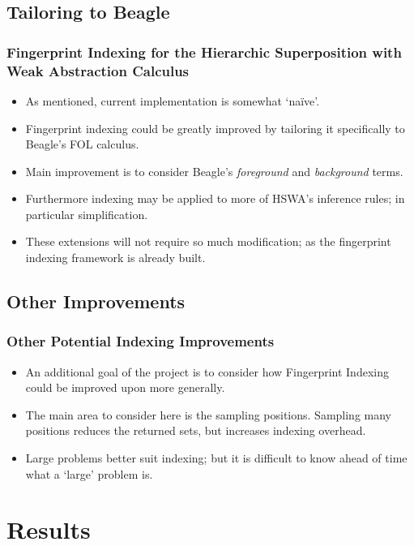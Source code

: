 \documentclass[10pt]{beamer}
\begin{document}
\begin{NoHyper}
\subsection{Tailoring to Beagle}
\begin{frame}
  \frametitle{Fingerprint Indexing for the Hierarchic Superposition with Weak Abstraction Calculus}
  \begin{itemize}
  \item<1-> As mentioned, current implementation is somewhat `na\"{i}ve'.
  \item<2-> Fingerprint indexing could be greatly improved by tailoring it specifically
  to Beagle's FOL calculus.
  \item<2-> Main improvement is to consider Beagle's \emph{foreground} and \emph{background}
  terms.
  \item<3-> Furthermore indexing may be applied to more
  of HSWA's inference rules; in particular simplification.
  \item<4-> These extensions will not require so much modification; as the fingerprint
  indexing framework is already built.
  \end{itemize}
\end{frame}

\subsection{Other Improvements}
\begin{frame}
  \frametitle{Other Potential Indexing Improvements}
  \begin{itemize}
  \item<1-> An additional goal of the project is to consider how Fingerprint Indexing
  could be improved upon more generally.
  \item<2-> The main area to consider here is the sampling positions. Sampling many
  positions reduces the returned sets, but increases indexing overhead.
  \item<3-> Large problems better suit indexing; but it is difficult to know ahead of
  time what a `large' problem is.
  \end{itemize}
\end{frame}



\section{Results}


\end{NoHyper}
\end{document}
